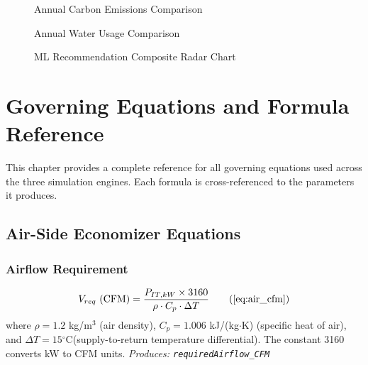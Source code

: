 \documentclass[12pt,a4paper]{report}
\newcommand{\degC}{$^{\circ}$C}
\begin{document}
\begin{figure}[H]
\centering
{}
\caption{Annual Carbon Emissions Comparison}
\label{fig:compare_carbon}
\end{figure}

\begin{figure}[H]
\centering
{}
\caption{Annual Water Usage Comparison}
\label{fig:compare_water}
\end{figure}

\begin{figure}[H]
\centering
{}
\caption{ML Recommendation Composite Radar Chart}
\label{fig:compare_radar}
\end{figure}

\newpage

\chapter{Governing Equations and Formula Reference}
\label{ch:formulas}

This chapter provides a complete reference for all governing equations used across the three
simulation engines. Each formula is cross-referenced to the parameters it produces.

\section{Air-Side Economizer Equations}

\subsection{Airflow Requirement}
\begin{equation}
V_{req}\ (\text{CFM}) = \frac{P_{IT,kW} \times 3160}{\rho \cdot C_p \cdot \Delta T}
\tag{\ref{eq:air_cfm}}
\end{equation}
where $\rho = 1.2$ kg/m$^3$ (air density), $C_p = 1.006$ kJ/(kg$\cdot$K) (specific heat of air),
and $\Delta T = 15$\degC (supply-to-return temperature differential). The constant 3160 converts
kW to CFM units. \textit{Produces: \texttt{requiredAirflow\_CFM}}
\end{document}
